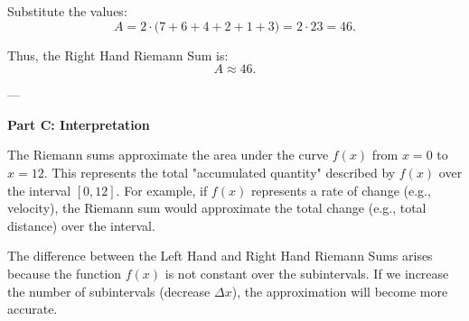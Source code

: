 \documentclass{article}
\begin{document}
Substitute the values:
\[
A = 2 \cdot \big(7 + 6 + 4 + 2 + 1 + 3\big) = 2 \cdot 23 = 46.
\]

Thus, the Right Hand Riemann Sum is:
\[
A \approx 46.
\]

---

\textbf{Part C: Interpretation}

The Riemann sums approximate the area under the curve \(f(x)\) from \(x = 0\) to \(x = 12\). This represents the total "accumulated quantity" described by \(f(x)\) over the interval \([0, 12]\). For example, if \(f(x)\) represents a rate of change (e.g., velocity), the Riemann sum would approximate the total change (e.g., total distance) over the interval.

The difference between the Left Hand and Right Hand Riemann Sums arises because the function \(f(x)\) is not constant over the subintervals. If we increase the number of subintervals (decrease \(\Delta x\)), the approximation will become more accurate.
\end{document}
